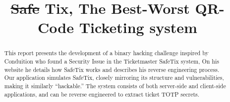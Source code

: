 \documentclass[conference,dvipsnames]{IEEEtran}
\newcommand{\soutthick}[1]{%
    \renewcommand{\ULthickness}{3pt}%
       \sout{#1}%
    \renewcommand{\ULthickness}{.3pt}%
}
\begin{document}
\title{\soutthick{Safe}Tix, The Best-Worst QR-Code Ticketing system}

\author{
}

\maketitle

\begin{abstract}
  This report presents the development of a binary hacking challenge inspired by Conduition who found a Security Issue in the Ticketmaster SafeTix system, 
  On his website \cite{reverse_engineering_ticketmaster} he details how SafeTix works and describes his reverse engineering process.
  Our application simulates SafeTix, closely mirroring its structure and vulnerabilities, making it similarly “hackable.” 
  The system consists of both server-side and client-side applications, and can be reverse engineered to extract ticket TOTP secrets.

\end{abstract}









\clearpage
%
\end{document}
